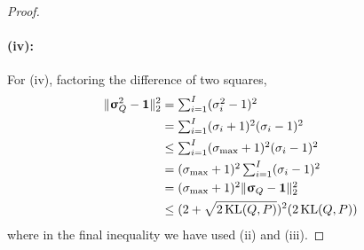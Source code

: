 \documentclass[twoside]{article}
\renewcommand{\ss}[1]{_{\text{#1}}}
\newcommand{\vsigma}{\bm{\upsigma}}
\newcommand{\vone}{\mathbf{1}}
\renewcommand{\P}{\mathbb{P}}
\newcommand{\Q}{\mathbb{Q}}
\renewcommand{\Q}{\ensuremath{Q}}
\renewcommand{\P}{\ensuremath{P}}
\newcommand{\KL}{\operatorname{KL}}
\renewcommand{\ss}[1]{_{\text{#1}}}        %
\DeclarePairedDelimiter\norm{\|}{\|}             %
\theoremstyle{theoremstyle}
\begin{document}
\begin{proof}
\paragraph{(iv):}     
    For (iv), factoring the difference of two squares, %
	\begin{align}
		\norm{\vsigma_\Q^2 - \vone}_2^2
		&\textstyle= \sum_{i=1}^I (\sigma^2_i -1)^2 
		\\
		&\textstyle =  \sum_{i=1}^I (\sigma_i +1)^2 (\sigma_i -1)^2 \\
 		&\textstyle\le \sum_{i=1}^I (\sigma\ss{max} + 1)^2 (\sigma_i-1)^2
		\\
		&\textstyle= (\sigma\ss{max} + 1)^2 \sum_{i=1}^I (\sigma_i-1)^2
		\\
		&\textstyle= (\sigma\ss{max} + 1)^2 \norm{\vsigma_\Q - \vone}_2^2
		\\
		&\le (2 + \sqrt{2 \KL(\Q, \P)})^2 (2 \KL(\Q, \P))
	\end{align}
where in the final inequality we have used (ii) and (iii).
\end{proof}
\end{document}

